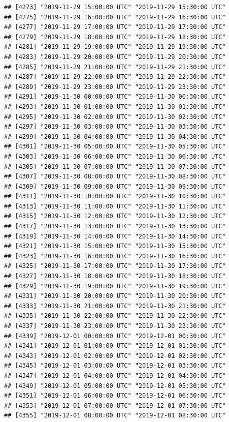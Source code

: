 \documentclass{article}\usepackage[]{graphicx}\usepackage[]{color}
\makeatletter
\newenvironment{kframe}{%
 \def\at@end@of@kframe{}%
 \ifinner\ifhmode%
  \def\at@end@of@kframe{\end{minipage}}%
  \begin{minipage}{\columnwidth}%
 \fi\fi%
 \def\FrameCommand##1{\hskip\@totalleftmargin \hskip-\fboxsep
 \colorbox{shadecolor}{##1}\hskip-\fboxsep
     \hskip-\linewidth \hskip-\@totalleftmargin \hskip\columnwidth}%
 \MakeFramed {\advance\hsize-\width
   \@totalleftmargin\z@ \linewidth\hsize
   \@setminipage}}%
 {\par\unskip\endMakeFramed%
 \at@end@of@kframe}
\newenvironment{knitrout}{}{} %
\makeatother
\begin{document}
\begin{knitrout}
\begin{kframe}
\begin{verbatim}
## [4273] "2019-11-29 15:00:00 UTC" "2019-11-29 15:30:00 UTC"
## [4275] "2019-11-29 16:00:00 UTC" "2019-11-29 16:30:00 UTC"
## [4277] "2019-11-29 17:00:00 UTC" "2019-11-29 17:30:00 UTC"
## [4279] "2019-11-29 18:00:00 UTC" "2019-11-29 18:30:00 UTC"
## [4281] "2019-11-29 19:00:00 UTC" "2019-11-29 19:30:00 UTC"
## [4283] "2019-11-29 20:00:00 UTC" "2019-11-29 20:30:00 UTC"
## [4285] "2019-11-29 21:00:00 UTC" "2019-11-29 21:30:00 UTC"
## [4287] "2019-11-29 22:00:00 UTC" "2019-11-29 22:30:00 UTC"
## [4289] "2019-11-29 23:00:00 UTC" "2019-11-29 23:30:00 UTC"
## [4291] "2019-11-30 00:00:00 UTC" "2019-11-30 00:30:00 UTC"
## [4293] "2019-11-30 01:00:00 UTC" "2019-11-30 01:30:00 UTC"
## [4295] "2019-11-30 02:00:00 UTC" "2019-11-30 02:30:00 UTC"
## [4297] "2019-11-30 03:00:00 UTC" "2019-11-30 03:30:00 UTC"
## [4299] "2019-11-30 04:00:00 UTC" "2019-11-30 04:30:00 UTC"
## [4301] "2019-11-30 05:00:00 UTC" "2019-11-30 05:30:00 UTC"
## [4303] "2019-11-30 06:00:00 UTC" "2019-11-30 06:30:00 UTC"
## [4305] "2019-11-30 07:00:00 UTC" "2019-11-30 07:30:00 UTC"
## [4307] "2019-11-30 08:00:00 UTC" "2019-11-30 08:30:00 UTC"
## [4309] "2019-11-30 09:00:00 UTC" "2019-11-30 09:30:00 UTC"
## [4311] "2019-11-30 10:00:00 UTC" "2019-11-30 10:30:00 UTC"
## [4313] "2019-11-30 11:00:00 UTC" "2019-11-30 11:30:00 UTC"
## [4315] "2019-11-30 12:00:00 UTC" "2019-11-30 12:30:00 UTC"
## [4317] "2019-11-30 13:00:00 UTC" "2019-11-30 13:30:00 UTC"
## [4319] "2019-11-30 14:00:00 UTC" "2019-11-30 14:30:00 UTC"
## [4321] "2019-11-30 15:00:00 UTC" "2019-11-30 15:30:00 UTC"
## [4323] "2019-11-30 16:00:00 UTC" "2019-11-30 16:30:00 UTC"
## [4325] "2019-11-30 17:00:00 UTC" "2019-11-30 17:30:00 UTC"
## [4327] "2019-11-30 18:00:00 UTC" "2019-11-30 18:30:00 UTC"
## [4329] "2019-11-30 19:00:00 UTC" "2019-11-30 19:30:00 UTC"
## [4331] "2019-11-30 20:00:00 UTC" "2019-11-30 20:30:00 UTC"
## [4333] "2019-11-30 21:00:00 UTC" "2019-11-30 21:30:00 UTC"
## [4335] "2019-11-30 22:00:00 UTC" "2019-11-30 22:30:00 UTC"
## [4337] "2019-11-30 23:00:00 UTC" "2019-11-30 23:30:00 UTC"
## [4339] "2019-12-01 00:00:00 UTC" "2019-12-01 00:30:00 UTC"
## [4341] "2019-12-01 01:00:00 UTC" "2019-12-01 01:30:00 UTC"
## [4343] "2019-12-01 02:00:00 UTC" "2019-12-01 02:30:00 UTC"
## [4345] "2019-12-01 03:00:00 UTC" "2019-12-01 03:30:00 UTC"
## [4347] "2019-12-01 04:00:00 UTC" "2019-12-01 04:30:00 UTC"
## [4349] "2019-12-01 05:00:00 UTC" "2019-12-01 05:30:00 UTC"
## [4351] "2019-12-01 06:00:00 UTC" "2019-12-01 06:30:00 UTC"
## [4353] "2019-12-01 07:00:00 UTC" "2019-12-01 07:30:00 UTC"
## [4355] "2019-12-01 08:00:00 UTC" "2019-12-01 08:30:00 UTC"

\end{verbatim}
\end{kframe}
\end{knitrout}
\end{document}
